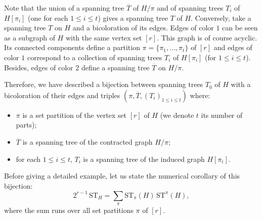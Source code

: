 \documentclass[12pt,a4paper,reqno]{amsart}
\theoremstyle{remark}
\newcommand{\ST}{\mathrm{ST}}
\begin{document}
Note that the union of a spanning tree $\overline{T}$ of $H/\pi$ and  of spanning trees $T_i$ of $H[\pi_i]$ (one for each $1 \le i \le t$) gives a spanning tree $T$ of $H$. Conversely, take a spanning tree $T$ on $H$ and a bicoloration of its edges. Edges of color $1$ can be seen as a subgraph of $H$ with the same vertex set $[r]$. This graph is of course acyclic. Its connected components define a partition $\pi=\{\pi_1,\dots,\pi_t\}$ of $[r]$ and edges of color $1$ correspond to a collection of spanning trees $T_i$ of $H[\pi_i]$ (for $1 \le i \le t$). Besides, edges of color $2$ define a spanning tree $\overline{T}$ on $H/\pi$.\bigskip

Therefore, we have described a bijection between spanning trees $T_0$ of $H$ with a bicoloration of their edges and triples $(\pi,\overline{T},(T_i)_{1\le i \le t})$ where:\vspace{2mm}
\begin{itemize}
    \item $\pi$ is a set partition of the vertex set $[r]$ of $H$ (we denote $t$ its number of parts);\vspace{2mm}
    \item $\overline{T}$ is a spanning tree of the contracted graph $H/\pi$;\vspace{2mm}
    \item for each $1 \le i \le t$,  $T_i$ is a spanning tree of the induced graph $H[\pi_i]$.\vspace{2mm}
\end{itemize}
Before giving a detailed example, let us state the numerical corollary of this bijection:
\begin{equation}\label{eq:coloredpseudotree}
    2^{r-1} \,\ST_H = \sum_{\pi} \ST_\pi(H) \,\ST^\pi(H),
\end{equation}
where the sum runs over all set partitions $\pi$ of $[r]$.
\end{document}
